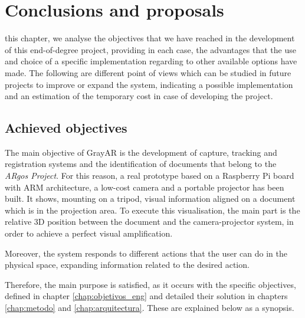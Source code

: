 \chapter{Conclusions and proposals}
\label{chap:conclusiones_eng}

 this chapter, we analyse the objectives that we have reached in the development of this end-of-degree project, providing in each case, the advantages that the use and choice of a specific implementation regarding to other available options have made. The following are different point of views which can be studied in future projects to improve or expand the system, indicating a possible implementation and an estimation of the temporary cost in case of developing the project.


\section{Achieved objectives}
The main objective of GrayAR is the development of capture, tracking and registration systems and the identification of documents that belong to the \textit{ARgos Project}. For this reason, a real prototype based on a Raspberry Pi board with ARM architecture, a low-cost camera and a portable projector has been built. It shows, mounting on a tripod, visual information aligned on a document which is in the projection area. To execute this visualisation, the main part is the relative 3D position between the document and the camera-projector system, in order to achieve a perfect visual amplification.

Moreover, the system responds to different actions that the user can do in the physical space, expanding information related to the desired action. 

Therefore, the main purpose is satisfied, as it occurs with the specific objectives, defined in chapter \ref{chap:objetivos_eng} and detailed their solution in chapters \ref{chap:metodo} and \ref{chap:arquitectura}. These are explained below as a synopsis.

